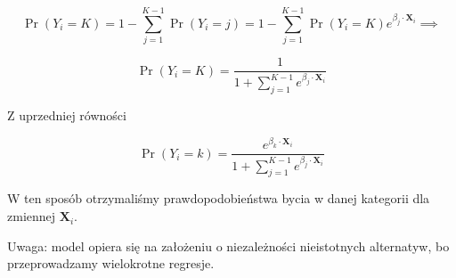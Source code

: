 \documentclass{article}
\begin{document}
\[\Pr(Y_i = K) = 1 - \sum_{j=1}^{K-1}{\Pr(Y_i = j)} = 1 - \sum_{j=1}^{K-1}{\Pr(Y_i = K) e^{\beta_j \cdot \mathbf{X}_i}}  \implies\]

\[\Pr(Y_i = K) = \frac{1}{1 + \sum_{j=1}^{K-1}{e^{\beta_j \cdot \mathbf{X}_i}}}\]

Z uprzedniej równości

\[\Pr(Y_i = k) = \frac{e^{\beta_k \cdot \mathbf{X}_i}}{1 + \sum_{j=1}^{K-1}{e^{\beta_j \cdot \mathbf{X}_i}}}\]

W ten sposób otrzymaliśmy prawdopodobieństwa bycia w danej kategorii dla zmiennej $\mathbf{X}_i$.

Uwaga: model opiera się na założeniu o niezależności nieistotnych alternatyw, bo przeprowadzamy wielokrotne regresje.
\end{document}
